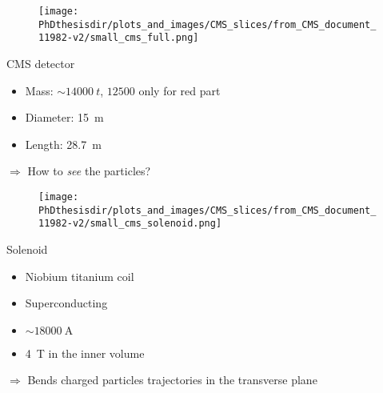 \begin{frame}
\begin{minipage}[t]{.6\textwidth}
\begin{figure}
\texttt{[image: \\PhDthesisdir/plots\_and\_images/CMS\_slices/from\_CMS\_document\_11982-v2/small\_cms\_full.png]}
\end{figure}
\end{minipage}
\hfill\begin{minipage}[t]{.35\textwidth}
\begin{block}{CMS detector}
\begin{itemize}
\item Mass: $\sim\SI{14000}{t}$, $\num{12500}$ only for red part
\item Diameter: \SI{15}{\meter}
\item Length: \SI{28.7}{\meter}
\end{itemize}
\end{block}

\begin{block}{}
$\Rightarrow$ How to \emph{see} the particles?
\end{block}
\end{minipage}
\end{frame}

\begin{frame}
\addtocounter{framenumber}{-1}
\transdissolve
\begin{minipage}[t]{.6\textwidth}
\begin{figure}
\texttt{[image: \\PhDthesisdir/plots\_and\_images/CMS\_slices/from\_CMS\_document\_11982-v2/small\_cms\_solenoid.png]}
\end{figure}
\end{minipage}
\hfill\begin{minipage}[t]{.35\textwidth}
\begin{block}{Solenoid}
\begin{itemize}
\item Niobium titanium coil
\item Superconducting
\item $\sim\SI{18000}{\ampere}$
\item \SI{4}{\tesla} in the inner volume
\end{itemize}
\end{block}

\begin{block}{}
$\Rightarrow$ Bends charged particles trajectories in the transverse plane
\end{block}
\end{minipage}
\end{frame}

